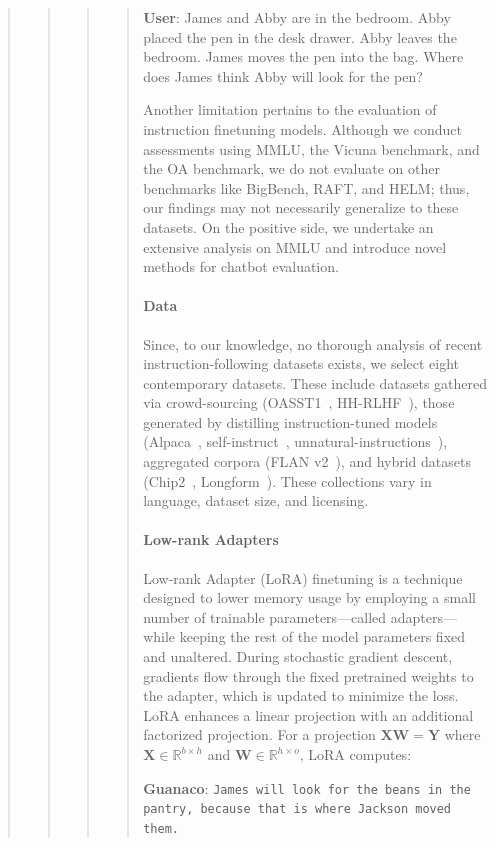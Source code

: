 \begin{quote}
\begin{quote}
\begin{quote}
\begin{quote}
    \textbf{User}: James and Abby are in the bedroom. Abby placed the pen in the desk drawer. Abby leaves the bedroom. James moves the pen into the bag. Where does James think Abby will look for the pen?

Another limitation pertains to the evaluation of instruction finetuning models. Although we conduct assessments using MMLU, the Vicuna benchmark, and the OA benchmark, we do not evaluate on other benchmarks like BigBench, RAFT, and HELM; thus, our findings may not necessarily generalize to these datasets. On the positive side, we undertake an extensive analysis on MMLU and introduce novel methods for chatbot evaluation.

\paragraph{Data} Since, to our knowledge, no thorough analysis of recent instruction-following datasets exists, we select eight contemporary datasets. These include datasets gathered via crowd-sourcing (OASST1~\citep{kopf2023openassistant}, HH-RLHF~\citep{bai2022training}), those generated by distilling instruction-tuned models (Alpaca~\citep{alpaca}, self-instruct~\citep{wang2022self}, unnatural-instructions~\citep{honovich2022unnatural}), aggregated corpora (FLAN v2~\citep{chung2022scaling}), and hybrid datasets (Chip2~\citep{laion2023}, Longform~\citep{koksal2023longform}). These collections vary in language, dataset size, and licensing.

\paragraph{Low-rank Adapters} Low-rank Adapter (LoRA) finetuning \citep{hu2021lora} is a technique designed to lower memory usage by employing a small number of trainable parameters—called adapters—while keeping the rest of the model parameters fixed and unaltered. During stochastic gradient descent, gradients flow through the fixed pretrained weights to the adapter, which is updated to minimize the loss. LoRA enhances a linear projection with an additional factorized projection. For a projection ${\mathbf{X} \mathbf{W} = \mathbf{Y}}$ where $\mathbf{X}\in  \mathbb{R}^{b\times h}$ and $\mathbf{W}\in  \mathbb{R}^{h\times o}$, LoRA computes:

    \textbf{Guanaco}: \texttt{James will look for the beans in the pantry, because that is where Jackson moved them.}
\end{quote}


\end{quote}
\end{quote}
\end{quote}
